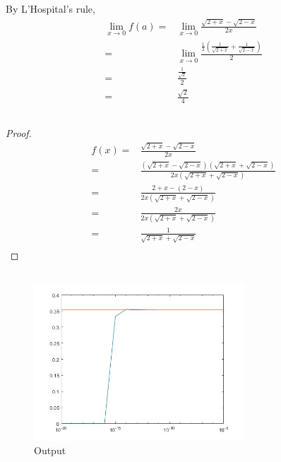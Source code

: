 \documentclass{article}
\begin{document}
    \section{}
        \subsection{}
            By L'Hospital's rule,
            \begin{equation*}
                \begin{split}
                    \lim_{x\rightarrow 0}f(a)=&\lim_{x\rightarrow 0}\frac{\sqrt{2+x}-\sqrt{2-x}}{2x}\\
                        =&\lim_{x\rightarrow 0}\frac{\frac{1}{2}(\frac{1}{\sqrt{2+x}}+\frac{1}{\sqrt{2-x}})}{2}\\
                        =&\frac{\frac{1}{\sqrt{2}}}{2}\\
                        =&\frac{\sqrt{2}}{4}
                \end{split}
            \end{equation*}
        \subsection{}
        \subsection{}
            \begin{proof}
                \begin{equation*}
                    \begin{split}
                        f(x)=&\frac{\sqrt{2+x}-\sqrt{2-x}}{2x}\\
                            =&\frac{(\sqrt{2+x}-\sqrt{2-x})(\sqrt{2+x}+\sqrt{2-x})}{2x(\sqrt{2+x}+\sqrt{2-x})}\\
                            =&\frac{2+x-(2-x)}{2x(\sqrt{2+x}+\sqrt{2-x})}\\
                            =&\frac{2x}{2x(\sqrt{2+x}+\sqrt{2-x})}\\
                            =&\frac{1}{\sqrt{2+x}+\sqrt{2-x}}\\
                    \end{split}
                \end{equation*}
            \end{proof}
        \subsection{}

\begin{figure}[H] 
    \centering 
    \includegraphics[width=0.7\textwidth]{img/Assignement.jpg}
    \caption{Output} 
\end{figure}
\end{document}
